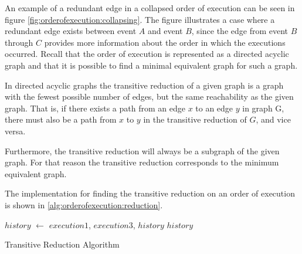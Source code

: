 	\newpar An example of a redundant edge in a collapsed order of execution can be seen in figure \autoref{fig:orderofexecution:collapsing}. The figure illustrates a case where a redundant edge exists between event $A$ and event $B$, since the edge from event $B$ through $C$ provides more information about the order in which the executions occurred. 
	Recall that the order of execution is represented as a directed acyclic graph and that it is possible to find a minimal equivalent graph for such a graph. 
	
	\newpar In directed acyclic graphs the transitive reduction of a given graph is a graph with the fewest possible number of edges, but the same reachability as the given graph.	That is, if there exists a path from an edge $x$ to an edge $y$ in graph G, there must also be a path from $x$ to $y$ in the transitive reduction of $G$, and vice versa.
		
	Furthermore, the transitive reduction will always be a subgraph of the given graph. For that reason the transitive reduction corresponds to the minimum equivalent graph.
	
	The implementation for finding the transitive reduction on an order of execution is shown in \autoref{alg:orderofexecution:reduction}.
	
	\begin{algorithm}[H]
		\begin{algorithmic}
										\State $history$ $\leftarrow$  {$execution1$, $execution3$, $history$}
									\EndIf
								\EndIf
							\EndFor
						\EndIf
					\EndFor
				\EndFor
			\State
			\Return $history$
			\EndFunction
		\end{algorithmic}
		\caption{Transitive Reduction Algorithm}
		\label{alg:orderofexecution:reduction}
	\end{algorithm}
	
